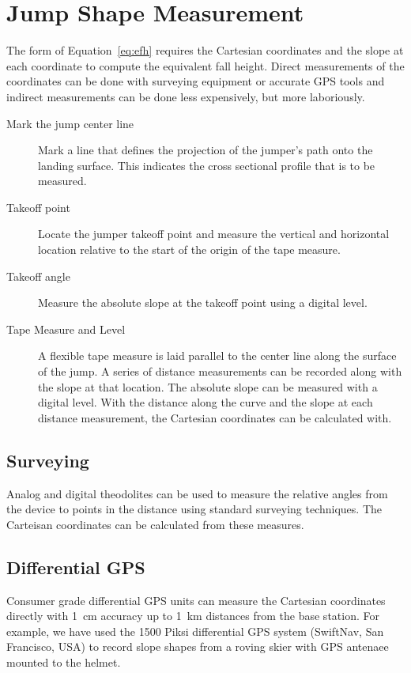 \documentclass{article}
\begin{document}
\section{Jump Shape Measurement}
%
The form of Equation~\ref{eq:efh} requires the Cartesian coordinates and the
slope at each coordinate to compute the equivalent fall height. Direct
measurements of the coordinates can be done with surveying equipment or
accurate GPS tools and indirect measurements can be done less expensively, but
more laboriously.
%
\begin{description}
  \item[Mark the jump center line] Mark a line that defines the projection of
    the jumper's path onto the landing surface. This indicates the cross
    sectional profile that is to be measured.
  \item[Takeoff point] Locate the jumper takeoff point and measure the vertical
    and horizontal location relative to the start of the origin of the tape
    measure.
  \item [Takeoff angle] Measure the absolute slope at the takeoff point using a
    digital level.
  \item[Tape Measure and Level] A flexible tape measure is laid parallel to the
    center line along the surface of the jump. A series of distance
    measurements can be recorded along with the slope at that location. The
    absolute slope can be measured with a digital level. With the distance
    along the curve and the slope at each distance measurement, the Cartesian
    coordinates can be calculated with.
\end{description}


\subsection{Surveying}
%
Analog and digital theodolites can be used to measure the relative angles from
the device to points in the distance using standard surveying techniques. The
Carteisan coordinates can be calculated from these measures.

\subsection{Differential GPS}
%
Consumer grade differential GPS units can measure the Cartesian coordinates
directly with 1~\si{\centi\meter} accuracy up to 1~\si{\kilo\meter}
distances from the base station. For example, we have used the 1500 Piksi
differential GPS system (SwiftNav, San Francisco, USA) to record slope shapes
from a roving skier with GPS antenaee mounted to the helmet.
\end{document}
